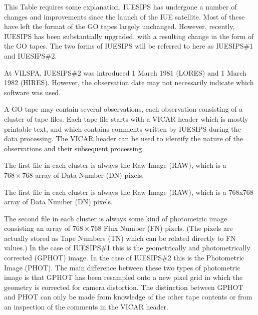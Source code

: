 This Table requires some explanation.  IUESIPS has undergone a number of
changes and improvements since the launch of the IUE satellite.  Most of
these have left the format of the GO tapes largely unchanged.  However,
recently, IUESIPS has been substantially upgraded, with a resulting change
in the form of the GO tapes.  The two forms of IUESIPS will be referred
to here as IUESIPS\#1 and IUESIPS\#2.

At VILSPA, IUESIPS\#2 was introduced 1 March 1981 (LORES) and 1 March 1982
(HIRES)\@.
However, the observation date may not necessarily indicate which software was
used.

A GO tape may contain several observations, each observation consisting of a
cluster of tape files.  Each tape file starts with a VICAR header which is
mostly printable text, and which contains comments written by IUESIPS
during the data processing.  The VICAR header can be used to identify the
nature of the observations and their subsequent processing.

\begin{latexonly}
The first file in each cluster is always the Raw Image (RAW), which is a
$768 \times 768$ array of Data Number (DN) pixels.
\end{latexonly}

\begin{htmlonly}
The first file in each cluster is always the Raw Image (RAW), which is a
768x768 array of Data Number (DN) pixels.
\end{htmlonly}

\begin{latexonly}
The second file in each cluster is always some kind of photometric image
consisting an array of $768 \times 768$ Flux Number (FN) pixels. (The pixels
are actually stored as Tape Numbers (TN) which can be related directly to FN
values.\@)  In the case of IUESIPS\#1 this is the geometrically and
photometrically corrected (GPHOT) image.  In the case of IUESIPS\#2 this is the
Photometric Image (PHOT)\@.  The main difference between these two types of
photometric image is that GPHOT has been resampled onto a new pixel grid in
which the geometry is corrected for camera distortion.  The distinction between
GPHOT and PHOT can only be made from knowledge of the other tape contents or
from an inspection of the comments in the VICAR header.
\end{latexonly}



